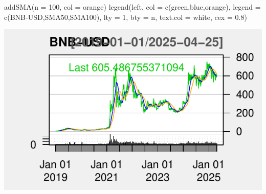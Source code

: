 \documentclass[]{tufte-handout}
\newenvironment{Shaded}{}{}
\newcommand{\AttributeTok}[1]{\textcolor[rgb]{0.49,0.56,0.16}{#1}}
\newcommand{\DecValTok}[1]{\textcolor[rgb]{0.25,0.63,0.44}{#1}}
\newcommand{\FloatTok}[1]{\textcolor[rgb]{0.25,0.63,0.44}{#1}}
\newcommand{\FunctionTok}[1]{\textcolor[rgb]{0.02,0.16,0.49}{#1}}
\newcommand{\NormalTok}[1]{#1}
\newcommand{\OtherTok}[1]{\textcolor[rgb]{0.00,0.44,0.13}{#1}}
\newcommand{\SpecialCharTok}[1]{\textcolor[rgb]{0.25,0.44,0.63}{#1}}
\newcommand{\StringTok}[1]{\textcolor[rgb]{0.25,0.44,0.63}{#1}}
\begin{document}
\begin{Shaded}
\begin{Highlighting}[]
\FunctionTok{addSMA}\NormalTok{(}\AttributeTok{n =} \DecValTok{100}\NormalTok{, }\AttributeTok{col =} \StringTok{\textquotesingle{}orange\textquotesingle{}}\NormalTok{)}
\FunctionTok{legend}\NormalTok{(}\StringTok{\textquotesingle{}left\textquotesingle{}}\NormalTok{, }\AttributeTok{col =} \FunctionTok{c}\NormalTok{(}\StringTok{\textquotesingle{}green\textquotesingle{}}\NormalTok{,}\StringTok{\textquotesingle{}blue\textquotesingle{}}\NormalTok{,}\StringTok{\textquotesingle{}orange\textquotesingle{}}\NormalTok{),}
       \AttributeTok{legend =} \FunctionTok{c}\NormalTok{(}\StringTok{\textquotesingle{}BNB{-}USD\textquotesingle{}}\NormalTok{,}\StringTok{\textquotesingle{}SMA50\textquotesingle{}}\NormalTok{,}\StringTok{\textquotesingle{}SMA100\textquotesingle{}}\NormalTok{), }\AttributeTok{lty =} \DecValTok{1}\NormalTok{, }\AttributeTok{bty =} \StringTok{\textquotesingle{}n\textquotesingle{}}\NormalTok{,}
       \AttributeTok{text.col =} \StringTok{\textquotesingle{}white\textquotesingle{}}\NormalTok{, }\AttributeTok{cex =} \FloatTok{0.8}\NormalTok{)}
\end{Highlighting}
\end{Shaded}

\includegraphics{cripto_update_files/figure-latex/unnamed-chunk-8-3}

\begin{Shaded}
\end{Shaded}
\end{document}
